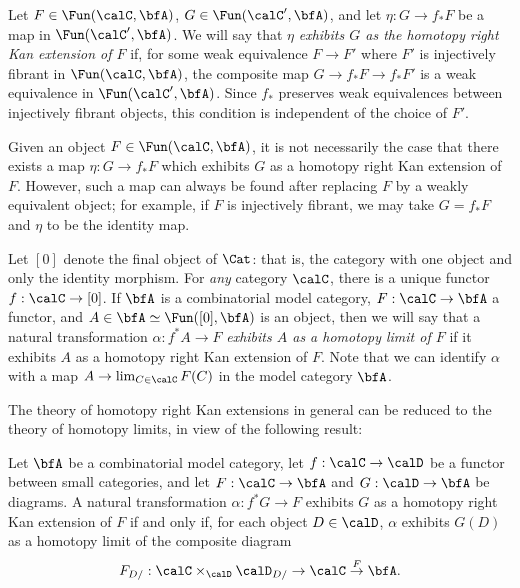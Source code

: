 Let $F \in \Fun(\calC, \bfA)$, $G \in \Fun(\calC', \bfA)$, and let $\eta: G \rightarrow f_{\ast} F$ be a map in $\Fun(\calC', \bfA)$. We will say that $\eta$ {\it exhibits $G$ as the homotopy right Kan extension of $F$}
if, for some weak equivalence $F \rightarrow F'$ where $F'$ is injectively fibrant in $\Fun(\calC, \bfA)$, the composite map $G \rightarrow f_{\ast} F \rightarrow f_{\ast} F'$ is a weak equivalence in
$\Fun(\calC', \bfA)$. Since $f_{\ast}$ preserves weak equivalences between injectively fibrant objects, this condition is independent of the choice of $F'$.

\begin{remark}
Given an object $F \in \Fun(\calC, \bfA)$, it is not necessarily the case that there exists a map
$\eta: G \rightarrow f_{\ast} F$ which exhibits $G$ as a homotopy right Kan extension of $F$. 
However, such a map can always be found after replacing $F$ by a weakly equivalent object; for example, if $F$ is injectively fibrant, we may take $G = f_{\ast} F$ and $\eta$ to be the identity map.
\end{remark}

Let $[0]$ denote the final object of $\Cat$: that is, the category with one object and only the identity morphism. For {\em any} category $\calC$, there is a unique
functor $f: \calC \rightarrow [0]$. If $\bfA$ is a combinatorial
model category, $F: \calC \rightarrow \bfA$ a functor, and $A \in \bfA \simeq \Fun( [0], \bfA)$
is an object, then we will say that a natural transformation
$\alpha: f^{\ast} A \rightarrow F$ {\it exhibits $A$ as a homotopy limit of $F$} if it exhibits $A$
as a homotopy right Kan extension of $F$. Note that we can identify
$\alpha$ with a map $A \rightarrow \lim_{C \in \calC} F(C)$ in the model category $\bfA$.

The theory of homotopy right Kan extensions in general can be reduced to the theory
of homotopy limits, in view of the following result:

\begin{proposition}\label{sabke}
Let $\bfA$ be a combinatorial model category, let $f: \calC \rightarrow \calD$ be a functor
between small categories, and let $F: \calC \rightarrow \bfA$ and $G: \calD \rightarrow \bfA$
be diagrams. A natural transformation $\alpha: f^{\ast} G \rightarrow F$ exhibits
$G$ as a homotopy right Kan extension of $F$ if and only if, for each object
$D \in \calD$, $\alpha$ exhibits $G(D)$ as a homotopy limit of the composite diagram
$$ F_{D/}: \calC \times_{ \calD } \calD_{D/} \rightarrow \calC \stackrel{F}{\rightarrow} \bfA. $$
\end{proposition}

